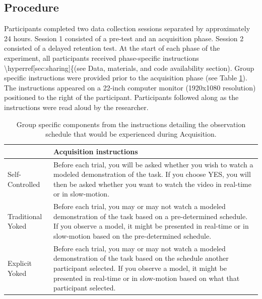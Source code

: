 \documentclass[
  english,
  doc, donotrepeattitle,floatsintext]{apa7}
\begin{document}
\hypertarget{procedure}{%
\subsection{Procedure}\label{procedure}}

Participants completed two data collection sessions separated by approximately 24 hours. Session 1 consisted of a pre-test and an acquisition phase. Session 2 consisted of a delayed retention test. At the start of each phase of the experiment, all participants received phase-specific instructions \textbackslash hyperref{[}sec:sharing{]}\{(see Data, materials, and code availability section). Group specific instructions were provided prior to the acquisition phase (see Table \ref{tab:table1}). The instructions appeared on a 22-inch computer monitor (1920x1080 resolution) positioned to the right of the participant. Participants followed along as the instructions were read aloud by the researcher. \medskip

\begin{table}

\caption{\label{tab:table1}Group specific components from the instructions detailing the observation schedule that would be experienced during Acquisition.}
\fontsize{10}{12}\selectfont
\begin{tabular}[t]{>{\raggedright\arraybackslash}p{8em}>{\raggedright\arraybackslash}p{33em}}
\toprule
  & Acquisition instructions\\
\midrule
Self-Controlled & Before each trial, you will be asked whether you wish to watch a modeled demonstration of the task. If you choose YES, you will then be asked whether you want to watch the video in real-time or in slow-motion.\\
\addlinespace
Traditional Yoked & Before each trial, you may or may not watch a modeled demonstration of the task based on a pre-determined schedule. If you observe a model, it might be presented in real-time or in slow-motion based on the pre-determined schedule.\\
\addlinespace
Explicit Yoked & Before each trial, you may or may not watch a modeled demonstration of the task based on the schedule another participant selected. If you observe a model, it might be presented in real-time or in slow-motion based on what that participant selected.\\
\bottomrule
\end{tabular}
\end{table}
\end{document}
